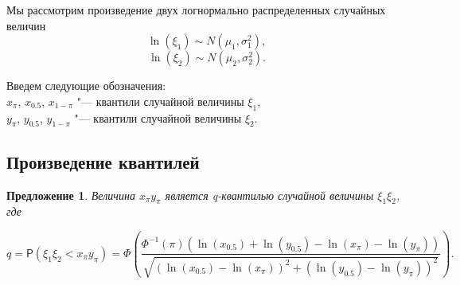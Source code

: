 \documentclass[12pt]{article}
\newtheorem{proposition}[theorem]{Предложение}
\begin{document}
	Мы рассмотрим произведение двух логнормально распределенных случайных величин 
	\begin{equation*}
		\ln(\xi_{1}) \sim N(\mu_{1}, \sigma _{1}^{2}),
	\end{equation*}
	\begin{equation*}
		\ln(\xi_{2}) \sim N(\mu_{2}, \sigma _{2}^{2}).
	\end{equation*}
	
	Введем следующие обозначения:\\
	$x_{\pi}$, $x_{0.5}$, $x_{1-\pi}$ "--- квантили случайной величины $\xi_{1}$,\\
	$y_{\pi}$, $y_{0.5}$, $y_{1-\pi}$ "--- квантили случайной величины $\xi_{2}$.
	
	\subsection{Произведение квантилей}
	\begin{proposition}
		Величина $x_{\pi}y_{\pi}$ является q-квантилью случайной величины $\xi_{1}\xi_{2}$, где
		
		\begin{equation}
			q = \mathsf{P}(\xi_{1}\xi_{2}< x_{\pi}y_{\pi}) =\Phi\left(\frac{\Phi^{-1}(\pi)(\ln(x_{0.5})+\ln(y_{0.5})-\ln(x_{\pi})-\ln(y_{\pi}))}{\sqrt{(\ln(x_{0.5})-\ln(x_{\pi}))^{2}+(\ln(y_{0.5})-\ln(y_{\pi}))^{2}}}\right). \label{20}
		\end{equation} 
	\end{proposition}
\end{document}
